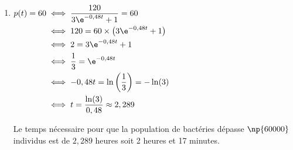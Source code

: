 \begin{enumerate}
et finalement par quotient, $\lim\limits_{t \to +\infty}p(t) =120$ 

Dans le contexte de l'exercice la population de la bactérie  se stabilisera vers $\np{120000}$. 



\item $\begin{aligned}[t] p(t)=60 & \iff \dfrac{120}{3 \e^{-0,48t} +1 }=60 \\
	& \iff 120 = 60 \times \left(3 \e^{-0,48t} +1\right)\\
	& \iff 2 = 3 \e^{-0,48t} +1\\
	& \iff \dfrac{1}{3}= \e^{-0,48t}\\
	& \iff -0,48 t = \ln\left(\dfrac{1}{3}\right)=-\ln(3)\\
	& \iff t = \dfrac{\ln(3)}{0,48}\approx 2,289
	\end{aligned}$
	
Le temps nécessaire pour que la population de bactéries dépasse $\np{60000}$ individus est de $2,289$ heures soit 2 heures et 17 minutes.
\end{enumerate}

